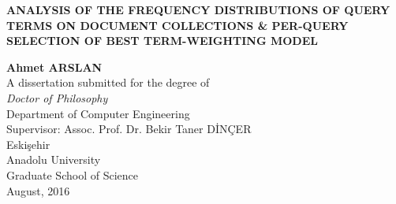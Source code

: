 %
%
%

\makeatother
{}
\thispagestyle{empty}
\setcounter{tocdepth}{3}
\begin{spacing}{1.0}
\vspace*{1cm}
\begin{center}{\textbf{ANALYSIS OF THE FREQUENCY DISTRIBUTIONS OF QUERY TERMS ON DOCUMENT COLLECTIONS \& PER-QUERY SELECTION OF BEST TERM-WEIGHTING MODEL}}\end{center}
\vspace*{4cm}
\begin{center}{\textbf{Ahmet ARSLAN}}
\vspace*{6cm}
\\{A dissertation submitted for the degree of}
\\{\emph{Doctor of Philosophy}}\vspace{0.6cm}
\\{Department of Computer Engineering}
\\{Supervisor: Assoc. Prof. Dr. Bekir Taner D\.{I}N\c{C}ER}
\vspace*{3cm}
\\{Eski\c{s}ehir}
\\{Anadolu University}
\\{Graduate School of Science}
\\{August, 2016} \end{center}
\end{spacing} 